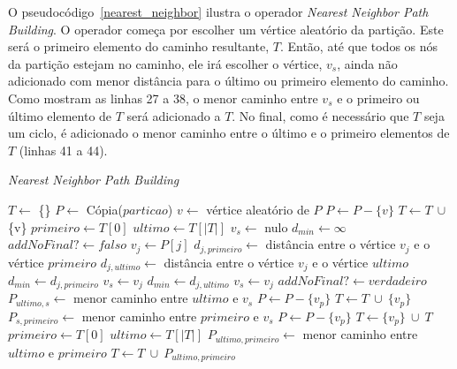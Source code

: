 O pseudocódigo~\ref{nearest_neighbor} ilustra o operador 
\textit{Nearest Neighbor Path Building}. O operador começa por escolher um 
vértice aleatório da partição. Este será o primeiro elemento do caminho 
resultante, $T$. Então, até que todos os nós da partição estejam no caminho, ele 
irá escolher o vértice, $v_{s}$, ainda não adicionado com menor distância para o 
último ou primeiro elemento do caminho. Como mostram as linhas 27 a 38, o menor 
caminho entre $v_{s}$ e o primeiro ou último elemento de $T$ será adicionado a 
$T$. No final, como é necessário que $T$ seja um ciclo, é adicionado o menor 
caminho entre o último e o primeiro elementos de $T$ (linhas 41 a 44).

\begin{algorithm}                   %
	\caption{\textit{Nearest Neighbor Path Building}}          %
	\label{nearest_neighbor}                           %
	\begin{algorithmic}[1]                   %
		\newline
		\State $T \gets $ \{\} 
		\State $P \gets $ Cópia($particao$)
		\State $v \gets $ vértice aleatório de $P$
		\State $P \gets P - \{v\}$
		\State $T \gets T\ \cup $ \{v\}
			\State $primeiro \gets T[0]$
			\State $ultimo \gets T[|T|]$
			\State $v_{s} \gets $ nulo 
			\State $d_{min} \gets \infty$
			\State $addNoFinal? \gets falso$
				\State $v_{j} \gets P[j]$
				\State $d_{j,primeiro} \gets $ distância entre o vértice $v_{j}$ e o vértice $primeiro$
				\State $d_{j,ultimo} \gets $ distância entre o vértice $v_{j}$ e o vértice $ultimo$
					\State $d_{min} \gets d_{j,primeiro}$
					\State $v_{s} \gets v_{j}$
				\EndIf
					\State $d_{min} \gets d_{j,ultimo}$
					\State $v_{s} \gets v_{j}$
					\State $addNoFinal? \gets verdadeiro$
				\EndIf
			\EndFor
				\State $P_{ultimo,s} \gets $ menor caminho entre $ultimo$ e $v_{s}$
					\State $P \gets P - \{v_{p}\}$
					\State $T \gets T\ \cup\ \{v_{p}\}$
				\EndFor
			\Else
				\State $P_{s,primeiro} \gets $ menor caminho entre $primeiro$ e $v_{s}$
					\State $P \gets P - \{v_{p}\}$
					\State $T \gets \{v_{p}\}\ \cup\ T$
				\EndFor
			\EndIf
		\EndWhile
		\State $primeiro \gets T[0]$
		\State $ultimo \gets T[|T|]$
		\State $P_{ultimo,primeiro} \gets $ menor caminho entre $ultimo$ e $primeiro$
		\State $T \gets T\ \cup\ P_{ultimo,primeiro}$
		\EndProcedure
	\end{algorithmic}
\end{algorithm}

